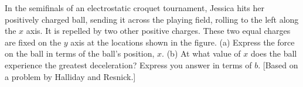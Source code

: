 In the semifinals of an electrostatic croquet
tournament, Jessica hits her positively charged ball,
sending it across the playing field, rolling to the left
along the $x$ axis. It is repelled by two other positive
charges. These two equal charges are fixed on the $y$ axis
at the locations shown in the figure. (a) Express the force
on the ball in terms of the ball's position, $x$. (b) At
what value of $x$ does the ball experience the greatest
deceleration? Express you answer in terms of $b$. [Based on
a problem by Halliday and Resnick.]\answercheck

